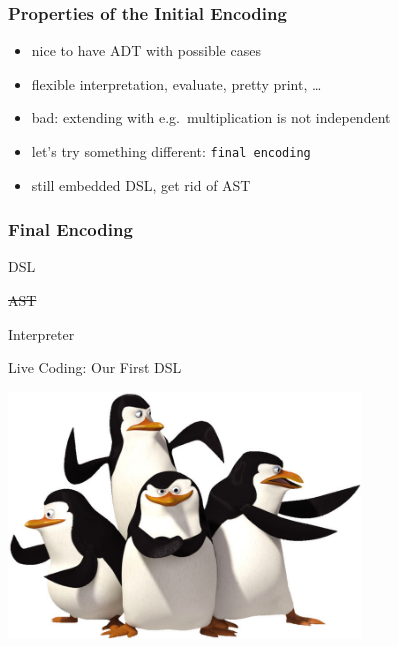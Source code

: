 \documentclass{beamer}
\begin{document}
\begin{frame}
  \frametitle{Properties of the Initial Encoding}
  \begin{itemize}
  \item nice to have ADT with possible cases
  \item flexible interpretation, evaluate, pretty print, \dots{}
  \item bad: extending with e.g.\ multiplication is not independent
  \item let's try something different: \texttt{final encoding}
  \item still embedded DSL, get rid of AST
  \end{itemize}
\end{frame}

\begin{frame}
  \frametitle{Final Encoding}
  \begin{center}
    \Huge
    DSL
  \end{center}
  \begin{center}
    \Huge
    \st{AST}
  \end{center}
  \begin{center}
    \Huge
    Interpreter
  \end{center}
\end{frame}


\begin{frame}
  \begin{center}
    \Huge Live Coding: Our First DSL
  \end{center}
  \begin{center}
    \includegraphics[width=0.7\textwidth]{../pics/penguins.jpg}
  \end{center}
\end{frame}
\end{document}
